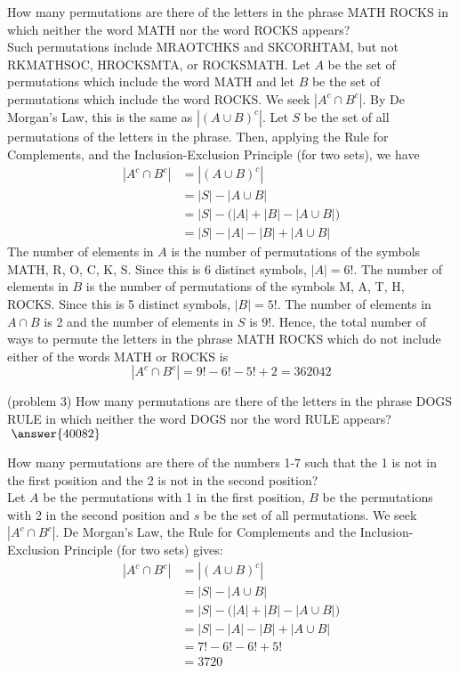 \documentclass[handout]{ximera}
\begin{document}
\begin{example}[example 3]
How many permutations are there of the letters in the phrase MATH ROCKS in which neither 
the word MATH nor the word ROCKS appears?\\
Such permutations include MRAOTCHKS and SKCORHTAM, but not RKMATHSOC, HROCKSMTA, or ROCKSMATH.
Let $A$ be the set of permutations which include the word MATH and let $B$ be the set of permutations which include the word
ROCKS.  We seek $|A^c \cap B^c|$. By De Morgan's Law, this is the same as $|(A \cup B)^c|$. 
Let $S$ be the set of all permutations of the letters in the phrase. Then, applying the Rule for Complements,
and the Inclusion-Exclusion Principle (for two sets), we have
\begin{align*}
|A^c \cap B^c| &= |(A \cup B)^c|\\
               &= |S| - |A\cup B|\\
               &= |S| - \Big(|A| + |B| - |A\cup B|\Big)\\
               &= |S| - |A| - |B| + |A\cup B|
\end{align*}
The number of elements in $A$ is the number of permutations of the symbols MATH, R, O, C, K, S.  
Since this is 6 distinct symbols, $|A| = 6!$. The number of elements in $B$ is the number of 
permutations of the symbols M, A, T, H, ROCKS.  
Since this is 5 distinct symbols, $|B| = 5!$. The number of elements in $A \cap B$ is 2 and the number of elements in $S$
is $9!$. Hence, the total number of ways to permute the letters in the phrase MATH ROCKS which do not 
include either of the words MATH or ROCKS is
\[
|A^c \cap B^c| = 9! - 6! - 5! + 2 = 362042
\]
\end{example}


\begin{problem}(problem 3)
How many permutations are there of the letters in the phrase DOGS RULE in which neither 
the word DOGS nor the word RULE appears? $\; \answer{40082}$
\end{problem}

\begin{example}[example 4]
How many permutations are there of the numbers 1-7 such that the 1 is not in the first 
position and the 2 is not in the second position?\\
Let $A$ be the permutations with 1 in the first position, $B$ be the permutations with 2 in the 
second position and $s$ be the set of all permutations. We seek $|A^c \cap B^c|$. 
De Morgan's Law, the Rule for Complements and the Inclusion-Exclusion Principle (for two sets) gives:
\begin{align*}
|A^c \cap B^c| &= |(A \cup B)^c|\\
               &= |S| - |A\cup B|\\
               &= |S| - \Big(|A| + |B| - |A\cup B|\Big)\\
               &= |S| - |A| - |B| + |A\cup B|\\
               &= 7! - 6! - 6! + 5!\\
               &= 3720
\end{align*}

\end{example}
\end{document}
